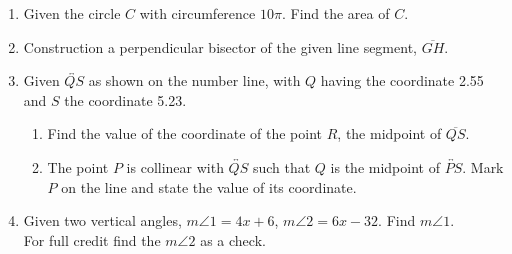\documentclass[12pt, twoside]{article}
\begin{document}
\begin{enumerate}
\newpage
\item Given the circle $C$ with circumference $10\pi$. Find the area of $C$. \vspace{5cm}

\item Construction a perpendicular bisector of the given line segment, $\overline{GH}$.\\
  \vspace{4cm}
  \begin{center}
  \end{center}

\newpage
\item Given $\overleftrightarrow{QS}$ as shown on the number line, with $Q$ having the coordinate 2.55 and $S$ the coordinate 5.23. \\[10pt] %
   \bigskip
  \begin{enumerate}
    \item Find the value of the coordinate of the point $R$, the midpoint of $\overline{QS}$. \vspace{4cm}
    \item The point $P$ is collinear with $\overleftrightarrow{QS}$ such that $Q$ is the midpoint of $\overleftrightarrow{PS}$. Mark $P$ on the line and state the value of its coordinate.
  \end{enumerate}\vspace{4cm}

\item Given two vertical angles, $m \angle 1 = 4x+6$, $m \angle 2 = 6x-32$. Find $m \angle 1$.\\ For full credit find the $m\angle 2$ as a check.
  \begin{flushright}
  \end{flushright}


\end{enumerate}
\end{document}

